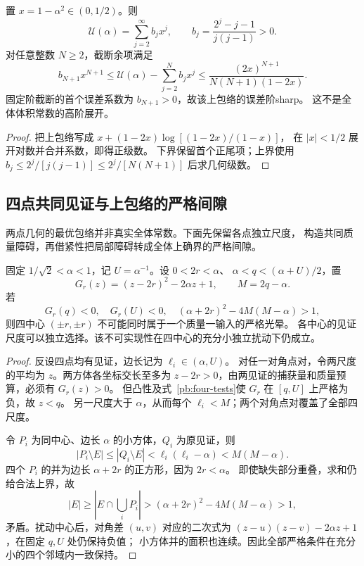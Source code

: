 \begin{proposition}[上包络的任意阶正级数与显式余项]\label{pb:all-orders}
置 $x=1-\alpha^2\in(0,1/2)$。则
\[
 \mathcal U(\alpha)=\sum_{j=2}^{\infty}b_jx^j,
 \qquad b_j=\frac{2^j-j-1}{j(j-1)}>0.
\]
对任意整数 $N\ge2$，截断余项满足
\[
 b_{N+1}x^{N+1}\le
 \mathcal U(\alpha)-\sum_{j=2}^Nb_jx^j
 \le\frac{(2x)^{N+1}}{N(N+1)(1-2x)}.
\]
固定阶截断的首个误差系数为 $b_{N+1}>0$，故该上包络的误差阶sharp。
这不是全体体积常数的高阶展开。
\end{proposition}
\begin{proof}
把上包络写成 $x+(1-2x)\log[(1-2x)/(1-x)]$，
在 $|x|<1/2$ 展开对数并合并系数，即得正级数。
下界保留首个正尾项；上界使用
$b_j\le2^j/[j(j-1)]\le2^j/[N(N+1)]$ 后求几何级数。
\end{proof}

\subsection{四点共同见证与上包络的严格间隙}

两点几何的最优包络并非真实全体常数。下面先保留各点独立尺度，
构造共同质量障碍，再借紧性把局部障碍转成全体上确界的严格间隙。

\begin{lemma}[四角质量障碍]\label{pb:four-certificate}
固定 $1/\sqrt2<\alpha<1$，记 $U=\alpha^{-1}$。设 $0<2r<\alpha$、
$\alpha<q<(\alpha+U)/2$，置
\[
 G_r(z)=(z-2r)^2-2\alpha z+1,\qquad M=2q-\alpha.
\]
若
\begin{equation}\label{pb:four-tests}
 G_r(q)<0,\quad G_r(U)<0,\quad
 (\alpha+2r)^2-4M(M-\alpha)>1,
\end{equation}
则四中心 $(\pm r,\pm r)$ 不可能同时属于一个质量一输入的严格光晕。
各中心的见证尺度可以独立选择。该不可实现性在四中心的充分小独立扰动下仍成立。
\end{lemma}
\begin{proof}
反设四点均有见证，边长记为 $\ell_i\in(\alpha,U)$。
对任一对角点对，令两尺度的平均为 $z$。两方体各坐标交长至多为
$z-2r>0$，由两见证的捕获量和质量预算，必须有 $G_r(z)>0$。
但凸性及式~\eqref{pb:four-tests}使 $G_r$ 在 $[q,U]$ 上严格为负，故 $z<q$。
另一尺度大于 $\alpha$，从而每个 $\ell_i<M$；两个对角点对覆盖了全部四尺度。

令 $P_i$ 为同中心、边长 $\alpha$ 的小方体，$Q_i$ 为原见证，则
\[
 |P_i\setminus E|\le |Q_i\setminus E|
 <\ell_i(\ell_i-\alpha)<M(M-\alpha).
\]
四个 $P_i$ 的并为边长 $\alpha+2r$ 的正方形，因为 $2r<\alpha$。
即使缺失部分重叠，求和仍给合法上界，故
\[
 |E|\ge\left|E\cap\bigcup_iP_i\right|
 >(\alpha+2r)^2-4M(M-\alpha)>1,
\]
矛盾。扰动中心后，对角差 $(u,v)$ 对应的二次式为
$(z-u)(z-v)-2\alpha z+1$，在固定 $q,U$ 处仍保持负值；
小方体并的面积也连续。因此全部严格条件在充分小的四个邻域内一致保持。
\end{proof}


